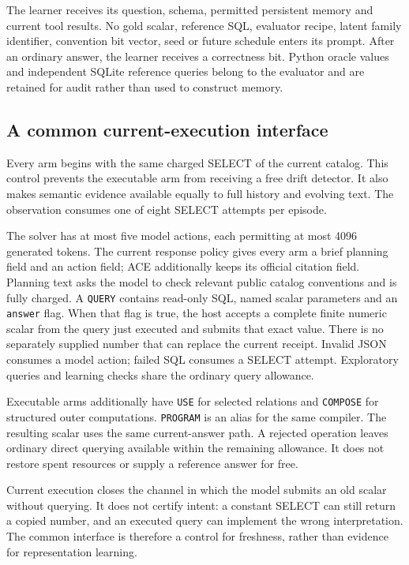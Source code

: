 \documentclass[10pt,twocolumn]{article}
\newcommand{\code}[1]{\texttt{\small #1}}
\begin{document}
The learner receives its question, schema, permitted persistent memory and
current tool results. No gold scalar, reference SQL, evaluator recipe, latent
family identifier, convention bit vector, seed or future schedule enters its
prompt. After an ordinary answer, the learner receives a correctness bit.
Python oracle values and independent SQLite reference queries belong to the
evaluator and are retained for audit rather than used to construct memory.

\subsection{A common current-execution interface}
Every arm begins with the same charged SELECT of the current catalog. This
control prevents the executable arm from receiving a free drift detector. It
also makes semantic evidence available equally to full history and evolving
text. The observation consumes one of eight SELECT attempts per episode.

The solver has at most five model actions, each permitting at most 4096 generated
tokens. The current response policy gives every arm a brief planning field and
an action field; ACE additionally keeps its official citation field. Planning
text asks the model to check relevant public catalog conventions and is fully
charged. A \code{QUERY} contains read-only SQL, named scalar parameters and an
\code{answer} flag. When that flag is true, the host accepts a complete finite
numeric scalar from the query just executed and submits that exact value.
There is no separately supplied number that can replace the current receipt.
Invalid JSON consumes a model action; failed SQL consumes a SELECT attempt.
Exploratory queries and learning checks share the ordinary query allowance.

Executable arms additionally have \code{USE} for selected relations and
\code{COMPOSE} for structured outer computations. \code{PROGRAM} is an alias for
the same compiler. The resulting scalar uses the same current-answer path.
A rejected operation leaves ordinary direct querying available within the
remaining allowance. It does not restore spent resources or supply a reference
answer for free.

Current execution closes the channel in which the model submits an old scalar
without querying. It does not certify intent: a constant SELECT can still
return a copied number, and an executed query can implement the wrong
interpretation. The common interface is therefore a control for freshness,
rather than evidence for representation learning.
\end{document}
